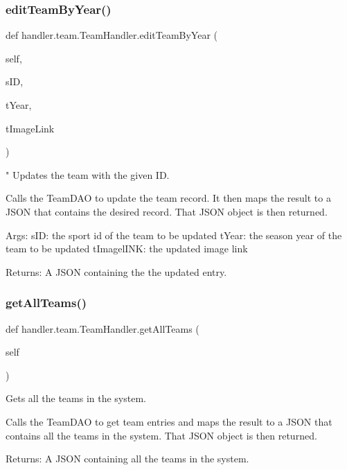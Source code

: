 \subsubsection{\texorpdfstring{edit\+Team\+By\+Year()}{editTeamByYear()}}
{\footnotesize\ttfamily def handler.\+team.\+Team\+Handler.\+edit\+Team\+By\+Year (\begin{DoxyParamCaption}\item[{}]{self,  }\item[{}]{s\+ID,  }\item[{}]{t\+Year,  }\item[{}]{t\+Image\+Link }\end{DoxyParamCaption})}

\begin{DoxyVerb}"
Updates the team with the given ID.

Calls the TeamDAO to update the team record. It then
maps the result to a JSON that contains the desired record. That JSON 
object is then returned.

Args:
    sID: the sport id of the team to be updated
    tYear: the season year of the team to be updated
    tImagelINK: the updated image link
    
Returns:
    A JSON containing the the updated entry.
\end{DoxyVerb}
 \mbox{\label{classhandler_1_1team_1_1_team_handler_acc2d42a1a0a2120c25425708fc3274e5}} 
\subsubsection{\texorpdfstring{get\+All\+Teams()}{getAllTeams()}}
{\footnotesize\ttfamily def handler.\+team.\+Team\+Handler.\+get\+All\+Teams (\begin{DoxyParamCaption}\item[{}]{self }\end{DoxyParamCaption})}

\begin{DoxyVerb}Gets all the teams in the system. 

Calls the TeamDAO to get team entries and maps the result
to a JSON that contains all the teams in the system. That
JSON object is then returned.
    
Returns:
    A JSON containing all the teams in the system.
\end{DoxyVerb}
 \mbox{\label{classhandler_1_1team_1_1_team_handler_ad8844435c8d6951748a7dc17702a2a19}} 
